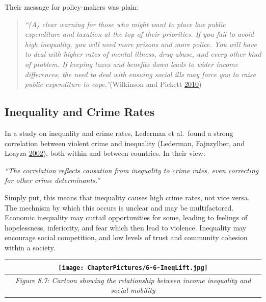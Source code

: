 \documentclass[]{tufte-handout}
\begin{document}
Their message for policy-makers was plain:

\begin{quote}
\emph{``(A) clear warning for those who might want to place low public
expenditure and taxation at the top of their priorities. If you fail to
avoid high inequality, you will need more prisons and more police. You
will have to deal with higher rates of mental illness, drug abuse, and
every other kind of problem. If keeping taxes and benefits down leads to
wider income differences, the need to deal with ensuing social ills may
force you to raise public expenditure to cope.''}(Wilkinson and Pickett
\protect\hyperlink{ref-Wilkinson2010}{2010})
\end{quote}

\hypertarget{inequality-and-crime-rates}{%
\subsection{Inequality and Crime
Rates}\label{inequality-and-crime-rates}}

In a study on inequality and crime rates, Lederman et al.~found a strong
correlation between violent crime and inequality (Lederman, Fajnzylber,
and Loayza \protect\hyperlink{ref-Lederman2002}{2002}), both within and
between countries. In their view:

\emph{``The correlation reflects causation from inequality to crime
rates, even correcting for other crime determinants.''}

Simply put, this means that inequality causes high crime rates, not vice
versa. The mechnism by which this occurs is unclear and may be
multifactored. Economic inequality may curtail opportunities for some,
leading to feelings of hopelessness, inferiority, and fear which then
lead to violence. Inequality may encourage social competition, and low
levels of trust and community cohesion within a society.

\begin{longtable}[]{@{}c@{}}
\toprule
\begin{minipage}[b]{0.97\columnwidth}\centering
\texttt{[image: ChapterPictures/6-6-IneqLift.jpg]}\strut
\end{minipage}\tabularnewline
\midrule
\endhead
\begin{minipage}[t]{0.97\columnwidth}\centering
\emph{Figure 8.7: Cartoon showing the relationship between income
inequality and social mobility}\strut
\end{minipage}\tabularnewline
\bottomrule
\end{longtable}
\end{document}
